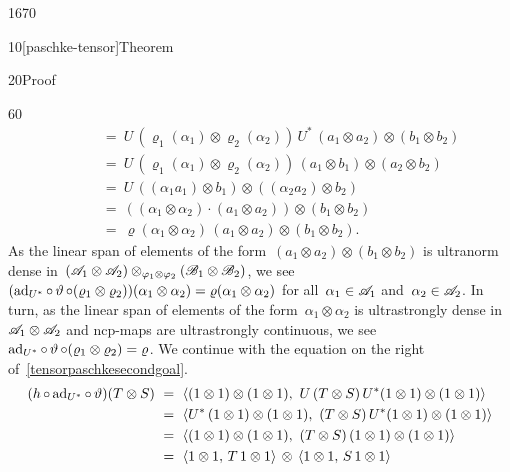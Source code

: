 \begin{parsec}{1670}
\begin{point}{10}[paschke-tensor]{Theorem}
\begin{point}{20}{Proof}
\begin{point}{60}
\begin{align*}
    &\qquad \ = \ 
    U \,(\varrho_1 (\alpha_1)\otimes \varrho_2(\alpha_2)) \, U^*
    \, (a_1 \otimes a_2) \otimes (b_1 \otimes b_2) \\
    &\qquad \ = \ 
    U \,(\varrho_1 (\alpha_1)\otimes \varrho_2(\alpha_2)) 
    \, (a_1 \otimes b_1) \otimes (a_2 \otimes b_2) \\
    &\qquad \ = \ 
    U \,  ((\alpha_1 a_1) \otimes b_1) \otimes ((\alpha_2 a_2) \otimes b_2) \\
    &\qquad \ = \ 
     ((\alpha_1 \otimes \alpha_2)\cdot (a_1 \otimes a_2)) \otimes (b_1 \otimes b_2) \\
    &\qquad \ = \ 
    \varrho(\alpha_1 \otimes\alpha_2) \,(a_1 \otimes a_2) \otimes (b_1 \otimes b_2).
\end{align*}
As the linear span of
    elements of the form~$(a_1 \otimes a_2) \otimes (b_1 \otimes b_2)$
    is ultranorm dense in~$(\mathscr{A}_1 \otimes \mathscr{A}_2)
                            \otimes_{\varphi_1 \otimes \varphi_2}
                            (\mathscr{B}_1 \otimes \mathscr{B}_2) $,
    we see~$(\mathrm{ad}_{U^*} \mathop{\circ} \vartheta \mathop{\circ} (\varrho_1 \otimes \varrho_2))
            (\alpha_1 \otimes \alpha_2)
            = \varrho(\alpha_1 \otimes \alpha_2)$
            for all~$\alpha_1\in\mathscr{A}_1$ and~$\alpha_2\in\mathscr{A}_2$.
In turn, as the linear span of elements of the form~$\alpha_1 \otimes \alpha_2$
    is ultrastrongly dense in~$\mathscr{A}_1 \otimes \mathscr{A}_2$
    and ncp-maps are ultrastrongly continuous,
    we see~$\mathrm{ad}_{U^*} \mathop{\circ} \vartheta \mathop{\circ} (\varrho_1 \otimes \varrho_2) =
        \varrho$.
        We continue with the equation on the right
        of~\eqref{tensorpaschkesecondgoal}.
\begin{align*}
    (h \after \ad_{U^*} \after \vartheta) (T \otimes S)
        & \ = \ \langle (1 \otimes 1) \otimes (1 \otimes 1),
                        \ U\, (T \otimes S)\, U^*(1 \otimes 1) \otimes (1 \otimes 1)
                        \rangle \\
        & \ = \ \langle U^* \,(1 \otimes 1) \otimes (1 \otimes 1),
                        \  (T \otimes S)\, U^*(1 \otimes 1) \otimes (1 \otimes 1)
                        \rangle \\
        & \ = \ \langle (1 \otimes 1) \otimes (1 \otimes 1),
                        \  (T \otimes S)\, (1 \otimes 1) \otimes (1 \otimes 1)
                        \rangle \\
        & \ = \
        \langle 1 \otimes 1, \,T\, 1\otimes 1\rangle \,\otimes\,
        \langle 1 \otimes 1, \,S\, 1\otimes 1\rangle \\

\end{align*}
\end{point}
\end{point}
\end{point}
\end{parsec}
